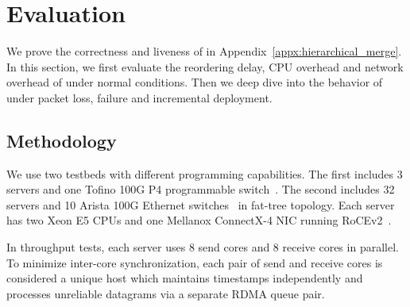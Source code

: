 \section{Evaluation}
\label{sec:evaluation}


We prove the correctness and liveness of \sys in Appendix~\ref{appx:hierarchical_merge}.
In this section, we first evaluate the reordering delay, CPU overhead and network overhead of \sys under normal conditions.
Then we deep dive into the behavior of \sys under packet loss, failure and incremental deployment.

\subsection{Methodology}
\label{sec:testbed}

We use two testbeds with different programming capabilities.
The first includes 3 servers and one Tofino 100G P4 programmable switch~\cite{tofino}.
The second includes 32 servers and 10 Arista 100G Ethernet switches~\cite{arista} in fat-tree topology.
Each server has two Xeon E5 CPUs and one Mellanox ConnectX-4 NIC running RoCEv2~\cite{infinibandrocev2}.


In throughput tests, each server uses 8 send cores and 8 receive cores in parallel.
To minimize inter-core synchronization, each pair of send and receive cores is considered a unique host which maintains timestamps independently and processes unreliable datagrams via a separate RDMA queue pair.

